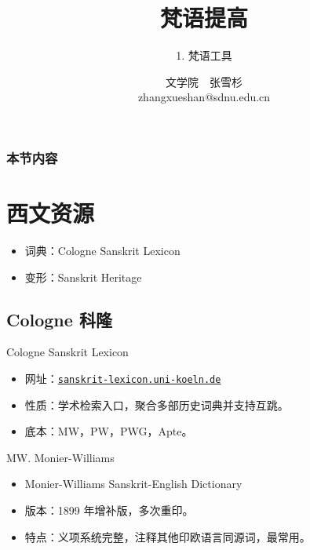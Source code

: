 \documentclass[17pt]{beamer}
\title{{梵语提高}}
\subtitle{1. 梵语工具}
\author[张雪杉]{文学院~~张雪杉 \\ zhangxueshan@sdnu.edu.cn}
\date{}
\newcommand{\dicturl}[2]{\href{#1}{\mbox{\texttt{#2}}}}
\begin{document}
	

\begin{frame}
  \titlepage
\end{frame}

\begin{frame}
  \frametitle{本节内容}
  \small
  \tableofcontents
\end{frame}

\section{西文资源}

\begin{frame}{\insertsection }
  \begin{itemize}
    \item 词典：Cologne Sanskrit Lexicon
    \item 变形：Sanskrit Heritage
  \end{itemize}
\end{frame}

\subsection{Cologne 科隆}
\begin{frame}{Cologne Sanskrit Lexicon}
  \small
  \begin{itemize}
    \item 网址：\dicturl{https://www.sanskrit-lexicon.uni-koeln.de/}{sanskrit-lexicon.uni-koeln.de}
    \item 性质：学术检索入口，聚合多部历史词典并支持互跳。
    \item 底本：MW，PW，PWG，Apte。
  \end{itemize}
\end{frame}

\begin{frame}{MW. Monier-Williams}
  \small
  \begin{itemize}
    \item Monier\mbox{-}Williams Sanskrit\mbox{-}English Dictionary
    \item 版本：1899 年增补版，多次重印。
    \item 特点：义项系统完整，注释其他印欧语言同源词，最常用。
  \end{itemize}
\end{frame}
\end{document}
